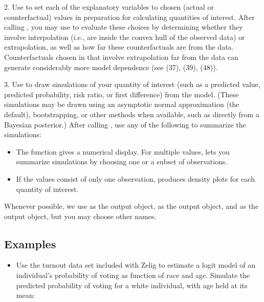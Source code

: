 \documentclass[letterpaper,10pt,english]{sphinxmanual}
\begin{document}
2. Use  to set each of the explanatory variables to chosen (actual or counterfactual)
values in preparation for calculating quantities of interest. After calling ,
you may use  to evaluate these choices by determining whether they involve
interpolation (i.e., are inside the convex hull of the observed data) or extrapolation,
as well as how far these counterfactuals are from the data. Counterfactuals chosen in
 that involve extrapolation far from the data can generate considerably more
model dependence (see (37), (39), (48)).

3. Use  to draw simulations of your quantity of interest (such as a predicted value,
predicted probability, risk ratio, or first difference) from the model. (These simulations
may be drawn using an asymptotic normal approximation (the default), bootstrapping,
or other methods when available, such as directly from a Bayesian posterior.) After
calling , use any of the following to summarize the simulations:
\begin{itemize}
\item {} 
The  function gives a numerical display. For multiple  values,
 lets you summarize simulations by choosing one or a subset of observations.

\item {} 
If the  values consist of only one observation,  produces density
plots for each quantity of interest.

\end{itemize}

Whenever possible, we use  as the  output object,  as the  output
object, and  as the  output object, but you may choose other names.


\subsection{Examples}
\label{4_statistical_commands:examples}\begin{itemize}
\item {} 
Use the turnout data set included with Zelig to estimate a logit model of an individual’s
probability of voting as function of race and age. Simulate the predicted probability of
voting for a white individual, with age held at its mean:

\end{itemize}
\end{document}
